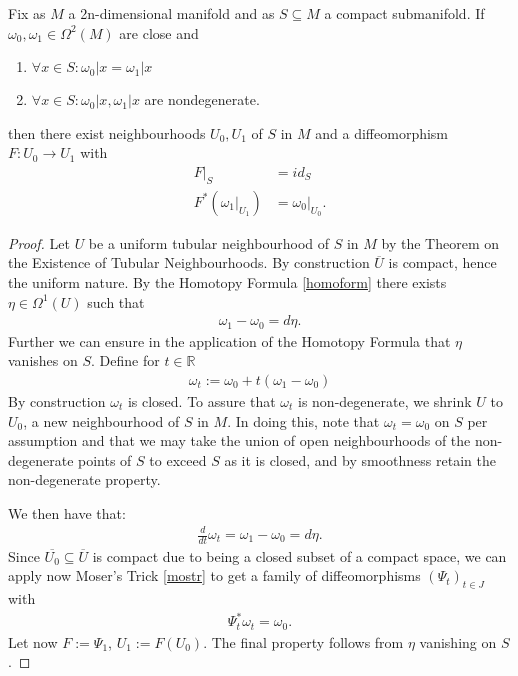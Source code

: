 \begin{theorem}\label{mosiso} \cite{salamon}
Fix as $M$ a 2n-dimensional manifold and as $S \subseteq M$ a compact submanifold. If $\omega_0 , \omega_1 \in \Omega^2(M)$ are close and
\begin{enumerate}
\item $\forall x \in S: \omega_0|x = \omega_1|x$
\item $\forall x \in S: \omega_0|x, \omega_1|x$ are nondegenerate.
\end{enumerate}
then there exist neighbourhoods $U_0,U_1$ of $S$ in $M$ and a diffeomorphism $F: U_0 \to U_1$ with
\begin{align*}
F|_S &= id_S \\
F^*(\omega_1|_{U_1}) &= \omega_0|_{U_0}.
\end{align*}
\end{theorem}

\begin{proof}
Let $U$ be a uniform tubular neighbourhood of $S$ in $M$ by the Theorem on the Existence of Tubular Neighbourhoods. By construction $\overline{U}$ is compact, hence the uniform nature. By the Homotopy Formula \ref{homoform} there exists $\eta \in \Omega^{1}(U)$ such that
\begin{align*}
\omega_1 - \omega_0 = d\eta.
\end{align*}
Further we can ensure in the application of the Homotopy Formula that $\eta$ vanishes on $S$.
Define for $t \in \mathbb{R}$
\begin{align*}
\omega_t := \omega_0 + t(\omega_1 - \omega_0)
\end{align*}
By construction $\omega_t$ is closed. To assure that $\omega_t$ is non-degenerate, we shrink $U$ to $U_0$, a new neighbourhood of $S$ in $M$. In doing this, note that $\omega_t = \omega_0$ on $S$ per assumption and that we may take the union of open neighbourhoods of the non-degenerate points of $S$ to exceed $S$ as it is closed, and by smoothness retain the non-degenerate property.

We then have that:
\begin{align*}
\frac{d}{dt} \omega_t = \omega_1 - \omega_0 = d\eta .
\end{align*}
Since $\overline{U_0} \subseteq \overline{U}$ is compact due to being a closed subset of a compact space, we can apply now Moser's Trick \ref{mostr} to get a family of diffeomorphisms $(\Psi_t)_{t \in J}$ with
\begin{align*}
\Psi^*_t \omega_t = \omega_0.
\end{align*}
Let now $F := \Psi_1$, $U_1 := F(U_0)$. The final property follows from $\eta$ vanishing on $S$.
\end{proof}

